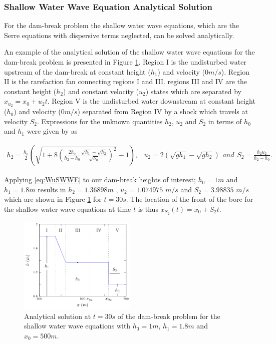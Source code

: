 \documentclass[times]{elsarticle}
\begin{document}
\subsubsection{Shallow Water Wave Equation Analytical Solution}
For the dam-break problem the shallow water wave equations, which are the Serre equations with dispersive terms neglected, can be solved analytically. 

An example of the analytical solution of the shallow water wave equations for the dam-break problem is presented in Figure \ref{fig:SWWEanadiagram}. Region I is the undisturbed water upstream of the dam-break at constant height ($h_1$) and velocity ($0m/s$). Region II is the rarefaction fan connecting regions I and III. regions III and IV are the constant height ($h_2$) and constant velocity ($u_2$) states which are separated by $x_{u_2} = x_0 + u_2t$. Region V is the undisturbed water downstream at constant height ($h_0$) and velocity ($0m/s$) separated from Region IV by a shock which travels at velocity $S_2$. Expressions for the unknown quantities $h_2$, $u_2$ and $S_2$ in terms of $h_0$ and $h_1$ were given by \citet{Wu-etal-1999-1210} as
\begin{linenomath*}
\begin{subequations}
\begin{gather}
h_2 = \frac{h_0}{2} \left(\sqrt{1 + 8 \left(\frac{2h_2}{h_2 - h_0}\frac{\sqrt{h_1} - \sqrt{h_2}}{\sqrt{h_0}}\right)^2} - 1\right),
\end{gather}
	\begin{gather}
	u_2 = 2\left(\sqrt{gh_1} - \sqrt{gh_2}\right)
	\end{gather}
and
	\begin{gather}
	S_2 = \frac{h_2 u_2}{h_2 - h_0}.
	\end{gather}
\label{eq:WuSWWE}	
\end{subequations}
\end{linenomath*}
Applying \eqref{eq:WuSWWE} to our dam-break heights of interest; $h_0 =1m$ and $h_1 = 1.8m$ results in $h_2 = 1.36898m$ , $u_2 = 1.074975$ $m/s$ and $S_2 = 3.98835$ $m/s$ which are shown in Figure \ref{fig:SWWEanadiagram} for $t=30s$. The location of the front of the bore for the shallow water wave equations at time $t$ is thus $x_{S_2}(t) = x_0 + S_2 t$.

\begin{figure}
	\centering
	\includegraphics[width=0.5\textwidth]{pics/explainers/SWWEana.pdf}
	\caption{Analytical solution at $t=30s$ of the dam-break problem for the shallow water wave equations with $h_0 = 1m$, $h_1=1.8m$ and $x_0=500m$.}
	\label{fig:SWWEanadiagram}
\end{figure}
\end{document}
